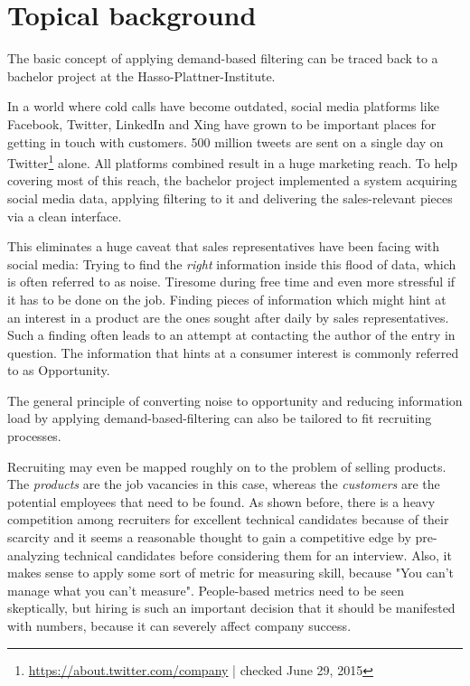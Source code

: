 \section{Topical background}
The basic concept of applying demand-based filtering can be traced back to a bachelor project at the Hasso-Plattner-Institute.


In a world where cold calls have become outdated\cite{bh:2014}, social media platforms like Facebook, Twitter, LinkedIn and Xing have grown to be important places for getting in touch with customers. 500 million tweets are sent on a single day on Twitter\footnote{\url{https://about.twitter.com/company} | checked June 29, 2015} alone. All platforms combined result in a huge marketing reach. To help covering most of this reach, the bachelor project implemented a system acquiring social media data, applying filtering to it and delivering the sales-relevant pieces via a clean interface.

This eliminates a huge caveat that sales representatives have been facing with social media: Trying to find the \textit{right} information inside this flood of data, which is often referred to as noise. Tiresome during free time and even more stressful if it has to be done on the job. Finding pieces of information which might hint at an interest in a product are the ones sought after daily by sales representatives. Such a finding often leads to an attempt at contacting the author of the entry in question. The information that hints at a consumer interest is commonly referred to as Opportunity.
\newline


The general principle of converting noise to opportunity and reducing information load by applying demand-based-filtering can also be tailored to fit recruiting processes.


Recruiting may even be mapped roughly on to the problem of selling  products. The \textit{products} are the job vacancies in this case, whereas the \textit{customers} are the potential employees that need to be found. As shown before, there is a heavy competition among recruiters for excellent technical candidates because of their scarcity and it seems a reasonable thought to gain a competitive edge by pre-analyzing technical candidates before considering them for an interview. Also, it makes sense to apply some sort of metric for measuring skill, because
"You can't manage what you can't measure"\cite{tdm:1986}.  People-based metrics need to be seen skeptically, but hiring is such an important decision that it should be manifested with numbers, because it can severely affect company success\cite{hk:1998}.